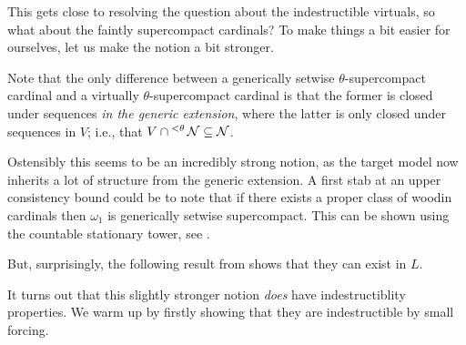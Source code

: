 \documentclass[../../main]{subfiles}
\begin{document}

This gets close to resolving the question about the indestructible virtuals, so what about the faintly supercompact cardinals? To make things a bit easier for ourselves, let us make the notion a bit stronger.


Note that the only difference between a generically setwise $\theta$-supercompact cardinal and a virtually $\theta$-supercompact cardinal is that the former is closed under sequences \textit{in the generic extension}, where the latter is only closed under sequences in $V$; i.e., that $V\cap{^{<\theta}}\operatorname{\mathcal N}\subseteq\operatorname{\mathcal N}$.

\qquad Ostensibly this seems to be an incredibly strong notion, as the target model now inherits a lot of structure from the generic extension. A first stab at an upper consistency bound could be to note that if there exists a proper class of woodin cardinals then $\omega_1$ is generically setwise supercompact. This can be shown using the countable stationary tower, see \cite{stationary-tower}.

\qquad But, surprisingly, the following result from \cite{usuba} shows that they can exist in $L$.


It turns out that this slightly stronger notion \textit{does} have indestructiblity properties. We warm up by firstly showing that they are indestructible by small forcing.
\end{document}
